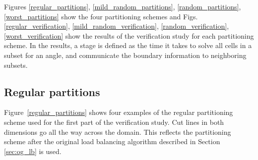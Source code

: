 Figures \ref{regular_partitions}, \ref{mild_random_partitions}, \ref{random_partitions}, \ref{worst_partitions} show the four partitioning schemes and Figs. \ref{regular_verification}, \ref{mild_random_verification}, \ref{random_verification}, \ref{worst_verification} show the results of the verification study for each partitioning scheme. In the results, a stage is defined as the time it takes to solve all cells in a subset for an angle, and communicate the boundary information to neighboring subsets.

\subsection{Regular partitions}

Figure~\ref{regular_partitions} shows four examples of the regular partitioning scheme used for the first part of the verification study. Cut lines in both dimensions go all the way across the domain. This reflects the partitioning scheme after the original load balancing algorithm described in Section \ref{sec:og_lb} is used.

